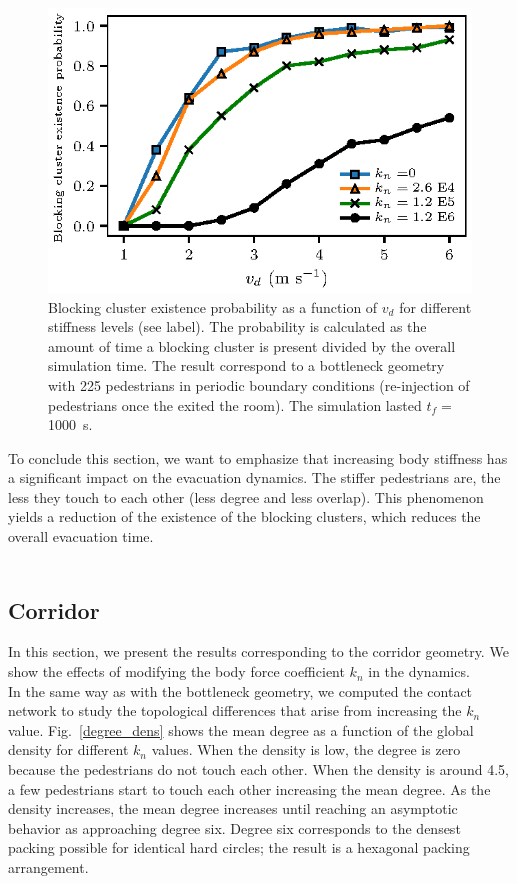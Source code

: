 \documentclass[preprint,12pt]{elsarticle}
\begin{document}
\begin{figure}[htbp!]
\centering
\includegraphics[width=0.7\columnwidth]
{./pbc_vs_vd_multi_kn.eps}
\caption{\label{pbc_vs_vd_multi_kn} Blocking cluster existence probability as a function of $v_d$ for different stiffness levels (see label). The probability is calculated as the amount of time a blocking cluster is present divided by the overall simulation time. The result correspond to a bottleneck geometry with 225 pedestrians in periodic boundary conditions (re-injection of pedestrians once the exited the room). The simulation lasted $t_f =$ 1000~s. }
\end{figure}


To conclude this section, we want to emphasize that increasing body stiffness has a significant impact on the evacuation dynamics. The stiffer pedestrians are, the less they touch to each other (less degree and less overlap). This phenomenon yields a reduction of the existence of the blocking clusters, which reduces the overall evacuation time. \\
\\

\subsection{\label{corridor} Corridor}

In this section, we present the results corresponding to the corridor geometry. We show the effects of modifying the body force coefficient $k_n$ in the dynamics.\\

In the same way as with the bottleneck geometry, we computed the contact network to study the topological differences that arise from increasing the $k_n$ value. Fig.~\ref{degree_dens} shows the mean degree as a function of the global density for different $k_n$ values. When the density is low,  the degree is zero because the pedestrians do not touch each other. When the density is around 4.5, a few pedestrians start to touch each other increasing the mean degree. As the density increases, the mean degree increases until reaching an asymptotic behavior as approaching degree six. Degree six corresponds to the densest packing possible for identical hard circles; the result is a hexagonal packing arrangement.\\
\end{document}
